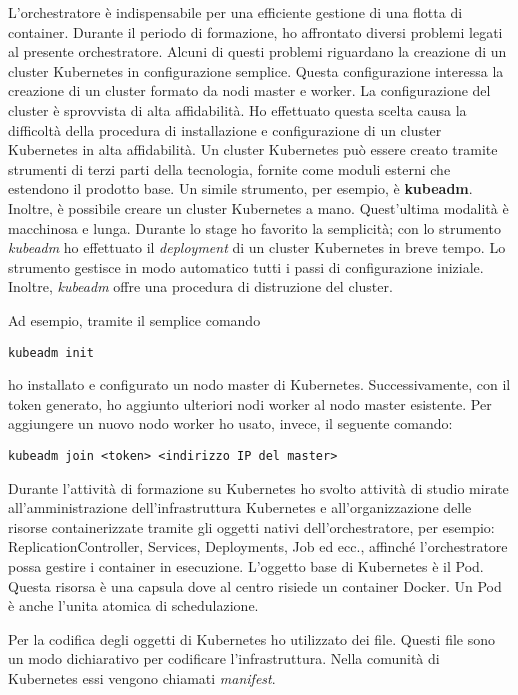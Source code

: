 L'orchestratore è indispensabile per una efficiente gestione 
di una flotta di container. Durante il periodo di formazione, 
ho affrontato diversi problemi legati al presente orchestratore. 
Alcuni di questi problemi riguardano la creazione di un cluster 
Kubernetes in configurazione semplice. Questa configurazione 
interessa la creazione di un cluster formato da nodi master 
e worker. La configurazione del cluster è sprovvista di alta affidabilità. 
Ho effettuato questa scelta causa la difficoltà della procedura 
di installazione e configurazione di un cluster Kubernetes 
in alta affidabilità. Un cluster Kubernetes può essere creato 
tramite strumenti di terzi parti della tecnologia, fornite
come moduli esterni che estendono il prodotto base. 
Un simile strumento, per esempio, è \textbf{kubeadm}. Inoltre, è 
possibile creare un cluster Kubernetes a mano. Quest'ultima modalità 
è macchinosa e lunga. Durante lo stage ho favorito 
la semplicità; con lo strumento \textit{kubeadm} ho effettuato 
il \textit{deployment} di un cluster Kubernetes in 
breve tempo. Lo strumento gestisce in modo
automatico tutti i passi di configurazione iniziale. 
Inoltre, \textit{kubeadm} offre una procedura di distruzione del
cluster.

Ad esempio, tramite il semplice comando 
\begin{verbatim}
kubeadm init
\end{verbatim}
ho installato e configurato un nodo master di Kubernetes. 
Successivamente, con il token generato, ho aggiunto ulteriori 
nodi worker al nodo master esistente. Per aggiungere un nuovo 
nodo worker ho usato, invece, il seguente comando: 
\begin{verbatim}
kubeadm join <token> <indirizzo IP del master>
\end{verbatim}

Durante l'attività di formazione su Kubernetes ho svolto 
attività di studio mirate all'amministrazione dell'infrastruttura 
Kubernetes e all'organizzazione delle risorse containerizzate 
tramite gli oggetti nativi dell'orchestratore, per esempio: 
ReplicationController, Services, Deployments, Job ed ecc., 
affinché l'orchestratore possa gestire i container in esecuzione. 
L'oggetto base di Kubernetes è il Pod. Questa risorsa è una capsula dove al centro  
risiede un container Docker. Un Pod è anche l'unita atomica di schedulazione.

Per la codifica degli oggetti di Kubernetes ho utilizzato dei file.
Questi file sono un modo dichiarativo per codificare l'infrastruttura.
Nella comunità di Kubernetes essi vengono chiamati \textit{manifest}. 

